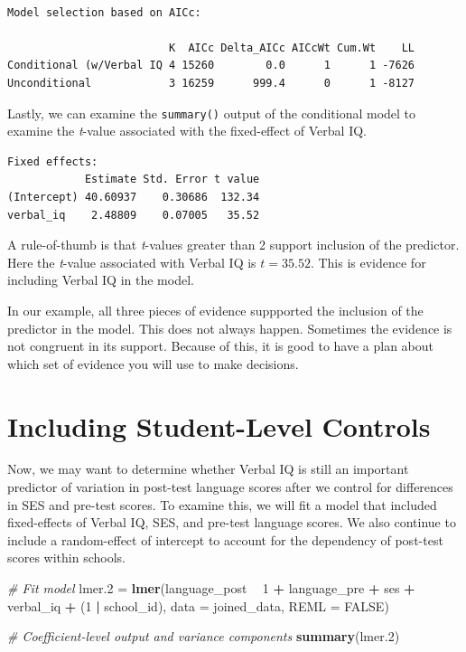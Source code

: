 \documentclass[]{book}
\newenvironment{Shaded}{\begin{snugshade}}{\end{snugshade}}
\newcommand{\CommentTok}[1]{\textcolor[rgb]{0.56,0.35,0.01}{\textit{#1}}}
\newcommand{\DataTypeTok}[1]{\textcolor[rgb]{0.13,0.29,0.53}{#1}}
\newcommand{\DecValTok}[1]{\textcolor[rgb]{0.00,0.00,0.81}{#1}}
\newcommand{\FloatTok}[1]{\textcolor[rgb]{0.00,0.00,0.81}{#1}}
\newcommand{\KeywordTok}[1]{\textcolor[rgb]{0.13,0.29,0.53}{\textbf{#1}}}
\newcommand{\NormalTok}[1]{#1}
\newcommand{\OperatorTok}[1]{\textcolor[rgb]{0.81,0.36,0.00}{\textbf{#1}}}
\newcommand{\OtherTok}[1]{\textcolor[rgb]{0.56,0.35,0.01}{#1}}
\newcommand{\StringTok}[1]{\textcolor[rgb]{0.31,0.60,0.02}{#1}}
\begin{document}
\begin{verbatim}

Model selection based on AICc:

                         K  AICc Delta_AICc AICcWt Cum.Wt    LL
Conditional (w/Verbal IQ 4 15260        0.0      1      1 -7626
Unconditional            3 16259      999.4      0      1 -8127
\end{verbatim}

Lastly, we can examine the \texttt{summary()} output of the conditional model to examine the \emph{t}-value associated with the fixed-effect of Verbal IQ.

\begin{verbatim}
Fixed effects:
            Estimate Std. Error t value
(Intercept) 40.60937    0.30686  132.34
verbal_iq    2.48809    0.07005   35.52
\end{verbatim}

A rule-of-thumb is that \emph{t}-values greater than 2 support inclusion of the predictor. Here the \emph{t}-value associated with Verbal IQ is \(t=35.52\). This is evidence for including Verbal IQ in the model.

In our example, all three pieces of evidence suppported the inclusion of the predictor in the model. This does not always happen. Sometimes the evidence is not congruent in its support. Because of this, it is good to have a plan about which set of evidence you will use to make decisions.

\hypertarget{including-student-level-controls}{%
\section{Including Student-Level Controls}\label{including-student-level-controls}}

Now, we may want to determine whether Verbal IQ is still an important predictor of variation in post-test language scores after we control for differences in SES and pre-test scores. To examine this, we will fit a model that included fixed-effects of Verbal IQ, SES, and pre-test language scores. We also continue to include a random-effect of intercept to account for the dependency of post-test scores within schools.

\begin{Shaded}
\begin{Highlighting}[]
\CommentTok{# Fit model}
\NormalTok{lmer}\FloatTok{.2}\NormalTok{ =}\StringTok{ }\KeywordTok{lmer}\NormalTok{(language_post }\OperatorTok{~}\StringTok{ }\DecValTok{1} \OperatorTok{+}\StringTok{ }\NormalTok{language_pre }\OperatorTok{+}\StringTok{ }\NormalTok{ses }\OperatorTok{+}\StringTok{ }\NormalTok{verbal_iq }\OperatorTok{+}\StringTok{  }\NormalTok{(}\DecValTok{1} \OperatorTok{|}\StringTok{ }\NormalTok{school_id), }\DataTypeTok{data =}\NormalTok{ joined_data, }\DataTypeTok{REML =} \OtherTok{FALSE}\NormalTok{)}

\CommentTok{# Coefficient-level output and variance components}
\KeywordTok{summary}\NormalTok{(lmer}\FloatTok{.2}\NormalTok{)}
\end{Highlighting}
\end{Shaded}
\end{document}
